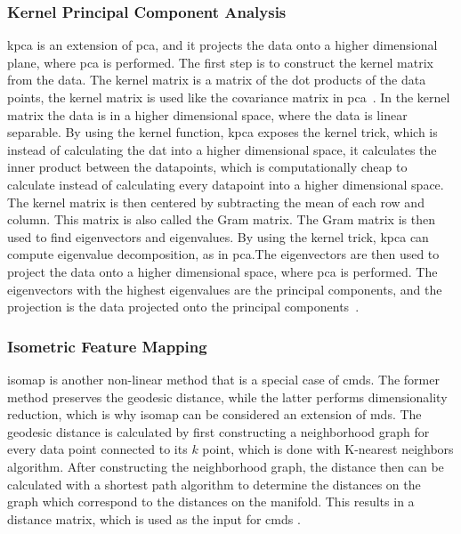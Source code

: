 
\subsubsection{Kernel Principal Component Analysis}\label{subsubsec:kernel-principal-component-analysis}
\gls{kpca} is an extension of \gls{pca}, and it projects the data onto a higher dimensional plane, where \gls{pca} is performed. 
The first step is to construct the kernel matrix from the data. The kernel matrix is a matrix of the dot products of the data points, the kernel matrix is used like the covariance matrix in \gls{pca}~\cite{kernel-pca}. In the kernel matrix the data is in a higher dimensional space, where the data is linear separable. By using the kernel function, \gls{kpca} exposes the kernel trick, which is instead of calculating the dat into a higher dimensional space, it calculates the inner product between the datapoints, which is computationally cheap to calculate instead of calculating every datapoint into a higher dimensional space.
The kernel matrix is then centered by subtracting the mean of each row and column. This matrix is also called the Gram matrix. The Gram matrix is then used to find eigenvectors and eigenvalues. By using the kernel trick, \gls{kpca} can compute eigenvalue decomposition, as in \gls{pca}.The eigenvectors are then used to project the data onto a higher dimensional space, where \gls{pca} is performed. The eigenvectors with the highest eigenvalues are the principal components, and the projection is the data projected onto the principal components~\cite{kernel-pca}. 

\subsubsection{Isometric Feature Mapping}\label{subsubsec:isometric-feature-mapping}
\gls{isomap} is another non-linear method that is a special case of \gls{cmds}. The former method preserves the geodesic distance, while the latter performs dimensionality reduction, which is why \gls{isomap} can be considered an extension of \gls{mds}. The geodesic distance is calculated by first constructing a neighborhood graph for every data point connected to its $k$ point, which is done with K-nearest neighbors algorithm. After constructing the neighborhood graph, the distance then can be calculated with a shortest path algorithm to determine the distances on the graph which correspond to the distances on the manifold. This results in a distance matrix, which is used as the input for \gls{cmds} \cite{Multidimensional-Scaling-Sammon-Mapping-and-Isomap}.

